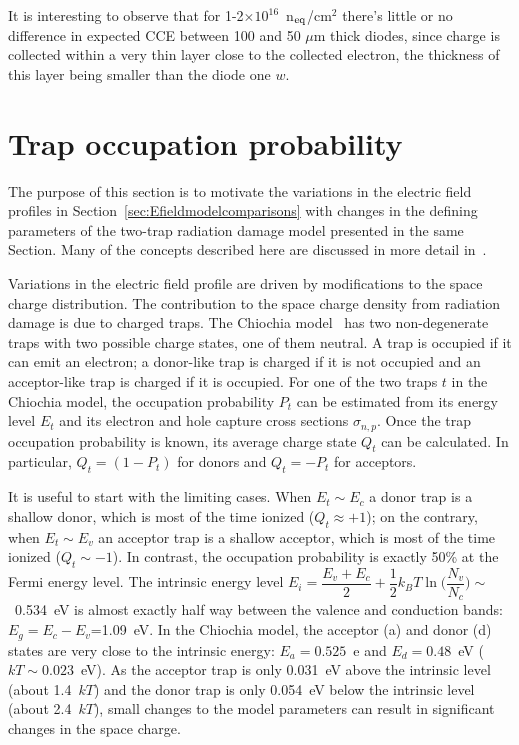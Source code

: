 It is interesting to observe that for 1-2$\times10^{16}$~n$_{\rm eq}$/cm$^2$ there's little or no 
difference in expected CCE between 100 and 50 $\mu$m thick diodes, since charge is collected 
within a very thin layer close to the collected electron, the thickness of this layer being smaller 
than the diode one $w$.

\chapter{Trap occupation probability}
\label{sec:trapoccprob}

The purpose of this section is to motivate the variations in the electric field profiles in Section~\ref{sec:Efieldmodelcomparisons} with changes in the defining parameters of the two-trap radiation damage model presented in the same Section.  Many of the concepts described here are discussed in more detail in~\cite{LUTZ1996}.

Variations in the electric field profile are driven by modifications to the space charge distribution.   The contribution to the space charge density from radiation damage is due to charged traps.  The Chiochia model~\cite{CHIOCHIA2006} has two non-degenerate traps with two possible charge states, one of them neutral.  A trap is occupied if it can emit an electron; a donor-like trap is charged if it is not occupied and an acceptor-like trap is charged if it is occupied.  For one of the two traps $t$ in the Chiochia model, the occupation probability $P_t$ can be estimated from its energy level $E_t$ and its electron and hole capture cross sections $\sigma_{n,p}$. Once the trap occupation probability is known, its average charge state $Q_t$  can be calculated.  In particular, $Q_t = (1-P_t)$ for donors and $Q_t=-P_t$ for acceptors.


It is useful to start with the limiting cases.  When $E_t\sim E_c$ a donor trap is a shallow donor, which is most of the time ionized ($Q_t\approx +1$); on the contrary, when $E_t\sim E_v$ an acceptor trap is a shallow acceptor, which is most of the time ionized ($Q_t\sim -1$).  In contrast, the occupation probability is exactly 50\% at the Fermi energy level.  The intrinsic energy level $E_i= \dfrac{E_v+E_c}{2}+\dfrac{1}{2}k_BT\ln\Big(\dfrac{N_v}{N_c}\Big)\sim$~0.534~eV is almost exactly half way between the valence and conduction bands: $E_g=E_c-E_v$=1.09~eV.  In the Chiochia model, the acceptor (a) and donor (d) states are very close to the intrinsic energy: $E_a=0.525$~e and  $E_d=0.48$~eV ($kT\sim 0.023$~eV).  As the acceptor trap is only 0.031~eV above the intrinsic level (about 1.4~$kT$) and the donor trap is only 0.054~eV below the  intrinsic level (about 2.4~$kT$), small changes to the model parameters can result in significant changes in the space charge.

